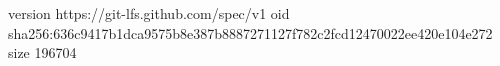 version https://git-lfs.github.com/spec/v1
oid sha256:636c9417b1dca9575b8e387b8887271127f782c2fcd12470022ee420e104e272
size 196704
